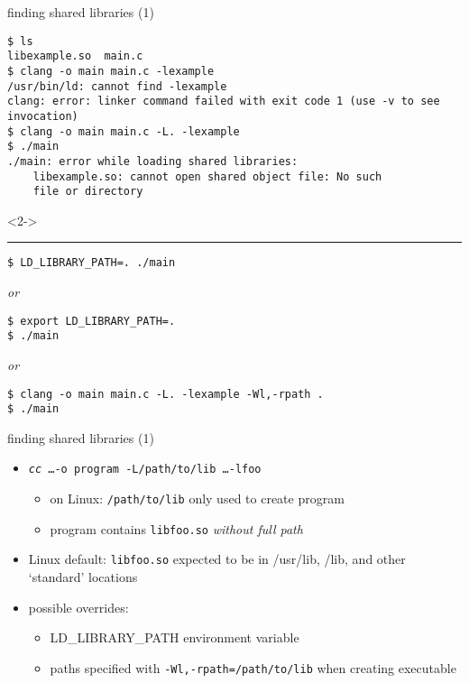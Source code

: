 \begin{frame}[fragile,label=sharedLib]{finding shared libraries (1)}
\begin{Verbatim}[fontsize=\fontsize{11}{12}\selectfont]
$ ls
libexample.so  main.c
$ clang -o main main.c -lexample
/usr/bin/ld: cannot find -lexample
clang: error: linker command failed with exit code 1 (use -v to see invocation)
$ clang -o main main.c -L. -lexample
$ ./main
./main: error while loading shared libraries:
    libexample.so: cannot open shared object file: No such
    file or directory
\end{Verbatim}
\begin{visibleenv}<2->
\hrule
\begin{Verbatim}[fontsize=\fontsize{11}{12}\selectfont]
$ LD_LIBRARY_PATH=. ./main
\end{Verbatim}
\textit{or}
\begin{Verbatim}[fontsize=\fontsize{11}{12}\selectfont]
$ export LD_LIBRARY_PATH=.
$ ./main
\end{Verbatim}
\textit{or}
\begin{Verbatim}[fontsize=\fontsize{11}{12}\selectfont]
$ clang -o main main.c -L. -lexample -Wl,-rpath .
$ ./main
\end{Verbatim}
\end{visibleenv}
\end{frame}

\begin{frame}{finding shared libraries (1)}
    \begin{itemize}
    \item \texttt{\textit{cc} \ldots -o program -L/path/to/lib \ldots -lfoo}
        \begin{itemize}
        \item on Linux: \texttt{/path/to/lib} only used to create program
        \item program contains \texttt{libfoo.so} \textit{without full path}
        \end{itemize}
    \item Linux default: \texttt{libfoo.so} expected to be in /usr/lib, /lib, and other `standard' locations
    \item possible overrides:
        \begin{itemize}
        \item LD\_LIBRARY\_PATH environment variable
        \item paths specified with \texttt{-Wl,-rpath=/path/to/lib} when creating executable
        \end{itemize}
    \end{itemize}
\end{frame}

